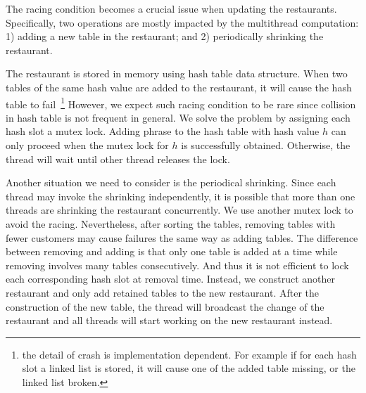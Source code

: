 The racing condition becomes a crucial issue when updating the restaurants.
Specifically, two operations are mostly impacted by the multithread
computation: 1) adding a new table in the restaurant; and 2) periodically
shrinking the restaurant.

The restaurant is stored in memory using hash table data structure. When two
tables of the same hash value are added to the restaurant, it will cause the
hash table to fail~\footnote{the detail of crash is implementation dependent.
  For example if for each hash slot a linked list is stored, it will cause one
of the added table missing, or the linked list broken.} However, we expect such
racing condition to be rare since collision in hash table is not frequent in
general. We solve the problem by assigning each hash slot a mutex lock. Adding phrase to the hash table with hash value $h$ can only proceed when the
mutex lock for $h$ is successfully obtained. Otherwise, the thread will wait
until other thread releases the lock.

Another situation we need to consider is the periodical shrinking. Since each
thread may invoke the shrinking independently, it is possible that more than one
threads are shrinking the restaurant concurrently. We use another mutex lock to
avoid the racing. Nevertheless, after sorting the tables, removing tables with
fewer customers may cause failures the same way as adding tables. The
difference between removing and adding is that only one table is added at a time
while removing involves many tables consecutively. And thus it is not
efficient to lock each corresponding hash slot at removal time. Instead, we
construct another restaurant and only add retained tables to the new restaurant.
After the construction of the new table, the thread will broadcast the change of
the restaurant and all threads will start working on the new restaurant instead.




